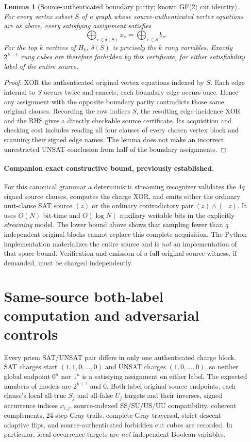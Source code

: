 \documentclass[11pt]{article}
\newtheorem{lemma}{Lemma}
\begin{document}
\begin{lemma}[Source-authenticated boundary parity; known GF(2) cut identity]
For every vertex subset $S$ of a graph whose source-authenticated vertex equations are as above, every satisfying assignment satisfies
\[
 \bigoplus_{e\in\delta(S)}x_e=\bigoplus_{v\in S}b_v.
\]
For the top $k$ vertices of $H_k$, $\delta(S)$ is precisely the $k$ rung variables. Exactly $2^{k-1}$ rung cubes are therefore forbidden by this certificate, for \emph{either} satisfiability label of the entire source.
\end{lemma}
\begin{proof}
XOR the authenticated original vertex equations indexed by $S$. Each edge internal to $S$ occurs twice and cancels; each boundary edge occurs once. Hence any assignment with the opposite boundary parity contradicts those same original clauses. Recording the row indices $S$, the resulting edge-incidence XOR and the RHS gives a directly checkable source certificate. Its acquisition and checking cost includes reading all four clauses of every chosen vertex block and scanning their signed edge names. The lemma does not make an incorrect unrestricted UNSAT conclusion from half of the boundary assignments.\qedhere
\end{proof}

\paragraph{Companion exact constructive bound, previously established.} For this canonical grammar a deterministic streaming recognizer validates the $4q$ signed source clauses, computes the charge XOR, and emits either the ordinary unit-clause SAT source $(z)$ or the ordinary contradictory pair $(z)\wedge(\neg z)$. It uses $O(N)$ bit-time and $O(\log N)$ auxiliary writable bits in the explicitly \emph{streaming} model. The lower bound above shows that sampling fewer than $q$ independent original blocks cannot replace this complete acquisition. The Python implementation materializes the entire source and is \emph{not} an implementation of that space bound. Verification and emission of a full original-source witness, if demanded, must be charged independently.

\section{Same-source both-label computation and adversarial controls}
Every prism SAT/UNSAT pair differs in only one authenticated charge block. SAT charges start $(1,1,0,\dots,0)$ and UNSAT charges $(1,0,\dots,0)$, so neither global endpoint $0^n$ nor $1^n$ is a satisfying assignment on either label. The expected numbers of models are $2^{k+1}$ and $0$. Both-label original-source endpoints, each clause's local all-true $S_j$ and all-false $U_j$ targets and their inverses, signed occurrence indices $x_{i,j}$, source-indexed SS/SU/US/UU compatibility, coherent complements, 24-step Gray trails, complete Gray traversal, strict-descent adaptive flips, and source-authenticated forbidden cut cubes are recorded. In particular, local occurrence targets are \emph{not} independent Boolean variables.
\end{document}
